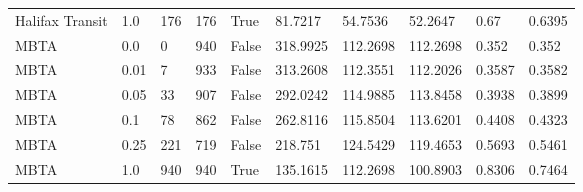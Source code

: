 \begin{tabular}{llllllllll}
Halifax Transit & 1.0 & 176 & 176 & True & 81.7217 & 54.7536 & 52.2647 & 0.67 & 0.6395 \\
MBTA & 0.0 & 0 & 940 & False & 318.9925 & 112.2698 & 112.2698 & 0.352 & 0.352 \\
MBTA & 0.01 & 7 & 933 & False & 313.2608 & 112.3551 & 112.2026 & 0.3587 & 0.3582 \\
MBTA & 0.05 & 33 & 907 & False & 292.0242 & 114.9885 & 113.8458 & 0.3938 & 0.3899 \\
MBTA & 0.1 & 78 & 862 & False & 262.8116 & 115.8504 & 113.6201 & 0.4408 & 0.4323 \\
MBTA & 0.25 & 221 & 719 & False & 218.751 & 124.5429 & 119.4653 & 0.5693 & 0.5461 \\
MBTA & 1.0 & 940 & 940 & True & 135.1615 & 112.2698 & 100.8903 & 0.8306 & 0.7464 \\
\bottomrule
\end{tabular}
